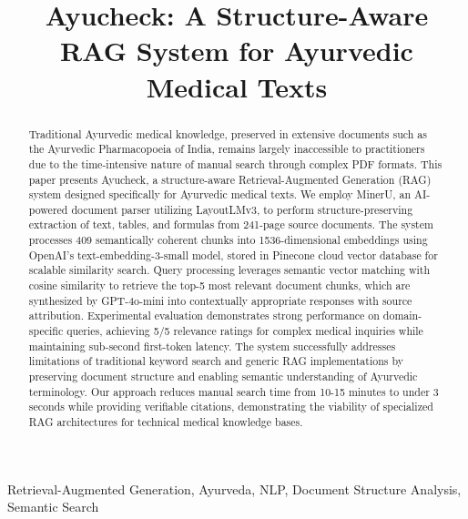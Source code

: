 \documentclass[conference]{IEEEtran}
\begin{document}
\title{Ayucheck: A Structure-Aware RAG System for Ayurvedic Medical Texts}

\author{
}

\maketitle

\begin{abstract}
Traditional Ayurvedic medical knowledge, preserved in extensive documents such as the Ayurvedic Pharmacopoeia of India, remains largely inaccessible to practitioners due to the time-intensive nature of manual search through complex PDF formats. This paper presents Ayucheck, a structure-aware Retrieval-Augmented Generation (RAG) system designed specifically for Ayurvedic medical texts. We employ MinerU, an AI-powered document parser utilizing LayoutLMv3, to perform structure-preserving extraction of text, tables, and formulas from 241-page source documents. The system processes 409 semantically coherent chunks into 1536-dimensional embeddings using OpenAI's text-embedding-3-small model, stored in Pinecone cloud vector database for scalable similarity search. Query processing leverages semantic vector matching with cosine similarity to retrieve the top-5 most relevant document chunks, which are synthesized by GPT-4o-mini into contextually appropriate responses with source attribution. Experimental evaluation demonstrates strong performance on domain-specific queries, achieving 5/5 relevance ratings for complex medical inquiries while maintaining sub-second first-token latency. The system successfully addresses limitations of traditional keyword search and generic RAG implementations by preserving document structure and enabling semantic understanding of Ayurvedic terminology. Our approach reduces manual search time from 10-15 minutes to under 3 seconds while providing verifiable citations, demonstrating the viability of specialized RAG architectures for technical medical knowledge bases.
\end{abstract}

\begin{IEEEkeywords}
Retrieval-Augmented Generation, Ayurveda, NLP, Document Structure Analysis, Semantic Search
\end{IEEEkeywords}
\end{document}
